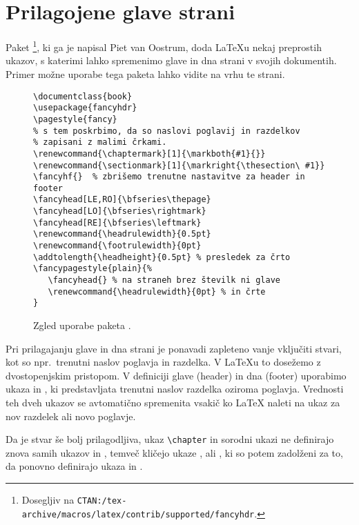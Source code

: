 \section{Prilagojene glave strani}
\label{sec:fancy}

Paket \footnote{Dosegljiv na
  \texttt{CTAN:/tex-archive/macros/latex/contrib/supported/fancyhdr}.}, ki ga je napisal 
Piet van Oostrum, doda \LaTeX{}u nekaj preprostih ukazov, s katerimi lahko 
spremenimo glave in dna strani v svojih dokumentih.  Primer možne uporabe tega 
paketa lahko vidite na vrhu te strani.

\begin{figure}[!htbp]
\begin{lined}{\textwidth}
\begin{verbatim}
\documentclass{book}
\usepackage{fancyhdr}
\pagestyle{fancy}
% s tem poskrbimo, da so naslovi poglavij in razdelkov 
% zapisani z malimi črkami.
\renewcommand{\chaptermark}[1]{\markboth{#1}{}}
\renewcommand{\sectionmark}[1]{\markright{\thesection\ #1}}
\fancyhf{}  % zbrišemo trenutne nastavitve za header in footer
\fancyhead[LE,RO]{\bfseries\thepage}
\fancyhead[LO]{\bfseries\rightmark}
\fancyhead[RE]{\bfseries\leftmark}
\renewcommand{\headrulewidth}{0.5pt}
\renewcommand{\footrulewidth}{0pt}
\addtolength{\headheight}{0.5pt} % presledek za črto
\fancypagestyle{plain}{%
   \fancyhead{} % na straneh brez številk ni glave 
   \renewcommand{\headrulewidth}{0pt} % in črte
}
\end{verbatim}
\end{lined}
\caption{Zgled uporabe paketa .} \label{fancyhdr}
\end{figure}

Pri prilagajanju glave in dna strani je ponavadi zapleteno vanje vključiti 
stvari, kot so npr.~trenutni naslov poglavja in razdelka. V  \LaTeX{}u
to dosežemo z dvostopenjskim pristopom. V definiciji glave (header) in dna (footer)
uporabimo ukaza  in , ki predstavljata
trenutni naslov razdelka oziroma poglavja.
Vrednosti teh dveh ukazov se avtomatično 
spremenita vsakič ko \LaTeX{} naleti na ukaz za nov razdelek ali novo poglavje. 

Da je stvar še bolj prilagodljiva, ukaz \verb|\chapter| in sorodni ukazi
ne definirajo znova samih ukazov  in , temveč kličejo ukaze
,  ali
, ki so potem zadolženi za to, da 
ponovno definirajo ukaza 
in .


